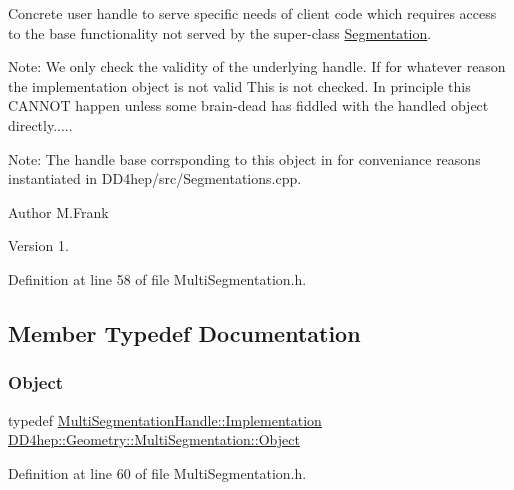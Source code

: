 Concrete user handle to serve specific needs of client code which requires access to the base functionality not served by the super-\/class \hyperlink{class_d_d4hep_1_1_geometry_1_1_segmentation}{Segmentation}.

Note\+: We only check the validity of the underlying handle. If for whatever reason the implementation object is not valid This is not checked. In principle this C\+A\+N\+N\+OT happen unless some brain-\/dead has fiddled with the handled object directly.....

Note\+: The handle base corrsponding to this object in for conveniance reasons instantiated in D\+D4hep/src/\+Segmentations.\+cpp.

\begin{DoxyAuthor}{Author}
M.\+Frank 
\end{DoxyAuthor}
\begin{DoxyVersion}{Version}
1. 
\end{DoxyVersion}


Definition at line 58 of file Multi\+Segmentation.\+h.



\subsection{Member Typedef Documentation}
\hypertarget{class_d_d4hep_1_1_geometry_1_1_multi_segmentation_ab30207d7b5e4366c7227de5743a88452}{}\label{class_d_d4hep_1_1_geometry_1_1_multi_segmentation_ab30207d7b5e4366c7227de5743a88452} 
\subsubsection{\texorpdfstring{Object}{Object}}
{\footnotesize\ttfamily typedef \hyperlink{class_d_d4hep_1_1_handle_ad7ff728a25806079516b8965b9113f1a}{Multi\+Segmentation\+Handle\+::\+Implementation} \hyperlink{class_d_d4hep_1_1_geometry_1_1_multi_segmentation_ab30207d7b5e4366c7227de5743a88452}{D\+D4hep\+::\+Geometry\+::\+Multi\+Segmentation\+::\+Object}}



Definition at line 60 of file Multi\+Segmentation.\+h.

\hypertarget{class_d_d4hep_1_1_geometry_1_1_multi_segmentation_ae2c7165290144f20af27248eab1858c5}{}\label{class_d_d4hep_1_1_geometry_1_1_multi_segmentation_ae2c7165290144f20af27248eab1858c5} 

